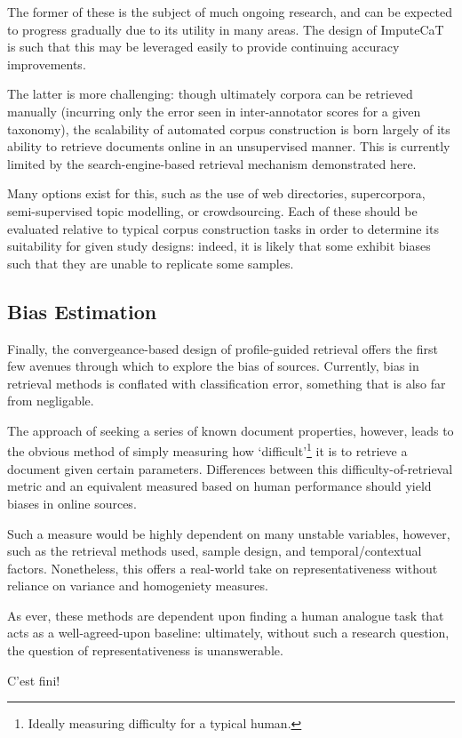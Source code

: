 The former of these is the subject of much ongoing research, and can be expected to progress gradually due to its utility in many areas.  The design of ImputeCaT is such that this may be leveraged easily to provide continuing accuracy improvements.

The latter is more challenging: though ultimately corpora can be retrieved manually (incurring only the error seen in inter-annotator scores for a given taxonomy\cite{sharoffs2015}), the scalability of automated corpus construction is born largely of its ability to retrieve documents online in an unsupervised manner.  This is currently limited by the search-engine-based retrieval mechanism demonstrated here.

Many options exist for this, such as the use of web directories, supercorpora, semi-supervised topic modelling, or crowdsourcing.  Each of these should be evaluated relative to typical corpus construction tasks in order to determine its suitability for given study designs: indeed, it is likely that some exhibit biases such that they are unable to replicate some samples.


\subsection{Bias Estimation}
Finally, the convergeance-based design of profile-guided retrieval offers the first few avenues through which to explore the bias of sources.  Currently, bias in retrieval methods is conflated with classification error, something that is also far from negligable.

The approach of seeking a series of known document properties, however, leads to the obvious method of simply measuring how `difficult'\footnote{Ideally measuring difficulty for a typical human.} it is to retrieve a document given certain parameters.  Differences between this difficulty-of-retrieval metric and an equivalent measured based on human performance should yield biases in online sources.

Such a measure would be highly dependent on many unstable variables, however, such as the retrieval methods used, sample design, and temporal/contextual factors.  Nonetheless, this offers a real-world take on representativeness without reliance on variance and homogeniety measures.

As ever, these methods are dependent upon finding a human analogue task that acts as a well-agreed-upon baseline: ultimately, without such a research question, the question of representativeness is unanswerable.




\begin{center}
\vfill
{\selectfont C'est fini!}
\vfill
\end{center}



